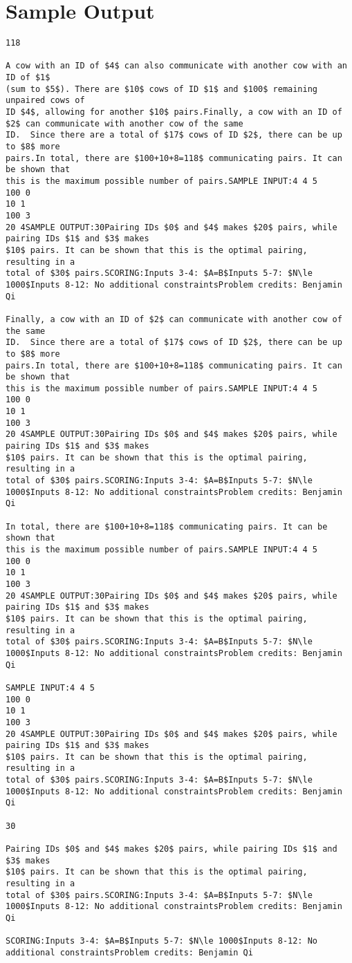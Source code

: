 \documentclass[12pt]{article}
\begin{document}
\section*{Sample Output}
\begin{verbatim}
118

A cow with an ID of $4$ can also communicate with another cow with an ID of $1$
(sum to $5$). There are $10$ cows of ID $1$ and $100$ remaining unpaired cows of
ID $4$, allowing for another $10$ pairs.Finally, a cow with an ID of $2$ can communicate with another cow of the same
ID.  Since there are a total of $17$ cows of ID $2$, there can be up to $8$ more
pairs.In total, there are $100+10+8=118$ communicating pairs. It can be shown that
this is the maximum possible number of pairs.SAMPLE INPUT:4 4 5
100 0
10 1
100 3
20 4SAMPLE OUTPUT:30Pairing IDs $0$ and $4$ makes $20$ pairs, while pairing IDs $1$ and $3$ makes
$10$ pairs. It can be shown that this is the optimal pairing, resulting in a
total of $30$ pairs.SCORING:Inputs 3-4: $A=B$Inputs 5-7: $N\le 1000$Inputs 8-12: No additional constraintsProblem credits: Benjamin Qi

Finally, a cow with an ID of $2$ can communicate with another cow of the same
ID.  Since there are a total of $17$ cows of ID $2$, there can be up to $8$ more
pairs.In total, there are $100+10+8=118$ communicating pairs. It can be shown that
this is the maximum possible number of pairs.SAMPLE INPUT:4 4 5
100 0
10 1
100 3
20 4SAMPLE OUTPUT:30Pairing IDs $0$ and $4$ makes $20$ pairs, while pairing IDs $1$ and $3$ makes
$10$ pairs. It can be shown that this is the optimal pairing, resulting in a
total of $30$ pairs.SCORING:Inputs 3-4: $A=B$Inputs 5-7: $N\le 1000$Inputs 8-12: No additional constraintsProblem credits: Benjamin Qi

In total, there are $100+10+8=118$ communicating pairs. It can be shown that
this is the maximum possible number of pairs.SAMPLE INPUT:4 4 5
100 0
10 1
100 3
20 4SAMPLE OUTPUT:30Pairing IDs $0$ and $4$ makes $20$ pairs, while pairing IDs $1$ and $3$ makes
$10$ pairs. It can be shown that this is the optimal pairing, resulting in a
total of $30$ pairs.SCORING:Inputs 3-4: $A=B$Inputs 5-7: $N\le 1000$Inputs 8-12: No additional constraintsProblem credits: Benjamin Qi

SAMPLE INPUT:4 4 5
100 0
10 1
100 3
20 4SAMPLE OUTPUT:30Pairing IDs $0$ and $4$ makes $20$ pairs, while pairing IDs $1$ and $3$ makes
$10$ pairs. It can be shown that this is the optimal pairing, resulting in a
total of $30$ pairs.SCORING:Inputs 3-4: $A=B$Inputs 5-7: $N\le 1000$Inputs 8-12: No additional constraintsProblem credits: Benjamin Qi

30

Pairing IDs $0$ and $4$ makes $20$ pairs, while pairing IDs $1$ and $3$ makes
$10$ pairs. It can be shown that this is the optimal pairing, resulting in a
total of $30$ pairs.SCORING:Inputs 3-4: $A=B$Inputs 5-7: $N\le 1000$Inputs 8-12: No additional constraintsProblem credits: Benjamin Qi

SCORING:Inputs 3-4: $A=B$Inputs 5-7: $N\le 1000$Inputs 8-12: No additional constraintsProblem credits: Benjamin Qi
\end{verbatim}
\end{document}

